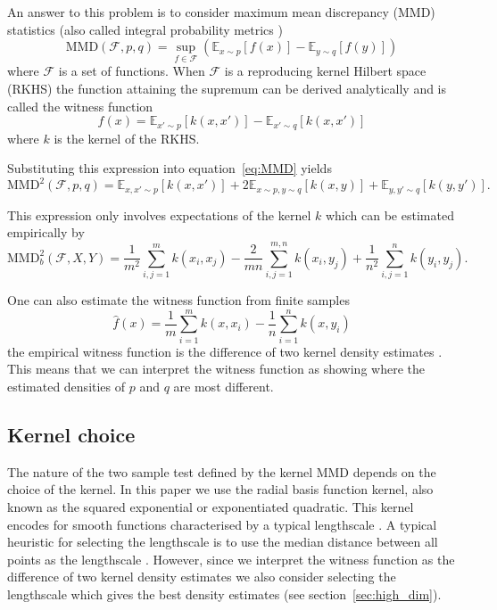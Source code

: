 An answer to this problem is to consider maximum mean discrepancy (MMD) \citep{Gretton2008-ik} statistics (also called integral probability metrics \citep{Muller1997-vs})
\begin{equation}
\textrm{MMD}(\mathcal{F},p,q) = \sup_{f \in \mathcal{F}}(\mathbb{E}_{x\sim p}[f(x)] - \mathbb{E}_{y\sim q}[f(y)])
\label{eq:MMD}
\end{equation}
where $\mathcal{F}$ is a set of functions.
When $\mathcal{F}$ is a reproducing kernel Hilbert space (RKHS) the function attaining the supremum can be derived analytically and is called the witness function
\begin{equation}
f(x) = \mathbb{E}_{x'\sim p}[k(x,x')] - \mathbb{E}_{x'\sim q}[k(x,x')]
\label{eq:witness}
\end{equation}
where $k$ is the kernel of the RKHS.

Substituting this expression into equation~\eqref{eq:MMD} yields
\begin{equation}
  \textrm{MMD}^2(\mathcal{F},p,q) = \mathbb{E}_{x,x'\sim p}[k(x,x')] + 2\mathbb{E}_{x\sim p,y\sim q}[k(x,y)] + \mathbb{E}_{y,y'\sim q}[k(y,y')].
\end{equation}

This expression only involves expectations of the kernel $k$ which can be estimated empirically by
\begin{equation}
  \textrm{MMD}_b^2(\mathcal{F},X,Y) = \frac{1}{m^2}\sum_{i,j=1}^{m}k(x_i,x_j) - \frac{2}{mn}\sum_{i,j=1}^{m,n}k(x_i,y_j) + \frac{1}{n^2}\sum_{i,j=1}^{n}k(y_i,y_j).
\label{eq:MMD_b}
\end{equation}

One can also estimate the witness function from finite samples
\begin{equation}
\hat{f}(x) = \frac{1}{m}\sum_{i=1}^{m}k(x,x_i) - \frac{1}{n}\sum_{i=1}^{n}k(x,y_i)
\label{eq:witness-estimate}
\end{equation}
\ie the empirical witness function is the difference of two kernel density estimates \citep[e.g.][]{Rosenblatt1956-hx, Parzen1962-hk}.
This means that we can interpret the witness function as showing where the estimated densities of $p$ and $q$ are most different.

\subsection{Kernel choice}

The nature of the two sample test defined by the kernel MMD depends on the choice of the kernel.
In this paper we use the radial basis function kernel, also known as the squared exponential or exponentiated quadratic.
This kernel encodes for smooth functions characterised by a typical lengthscale \citep[e.g.][]{Rasmussen2006-ml}.
A typical heuristic for selecting the lengthscale is to use the median distance between all points as the lengthscale \citep[e.g.][]{Gretton2008-gs}.
However, since we interpret the witness function as the difference of two kernel density estimates we also consider selecting the lengthscale which gives the best density estimates (see section~\ref{sec:high_dim}).

